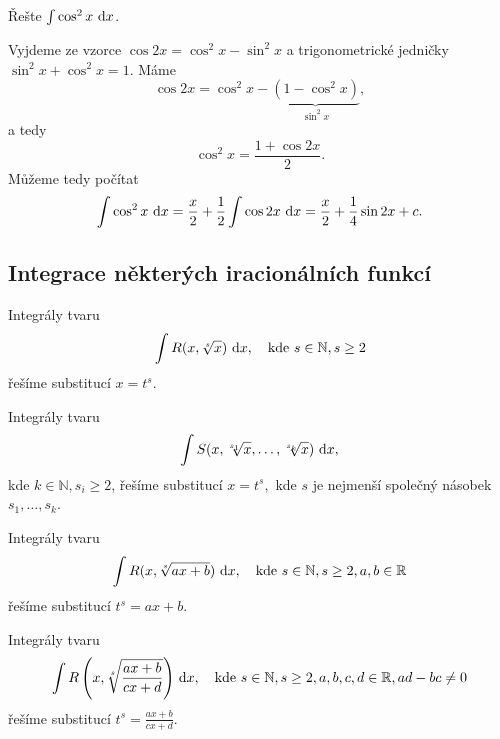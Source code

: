\begin{priklad}\label{prcos}
Řešte $\int \cos^2 x \, \mathop{}\!\mathrm{d} x$.
\end{priklad}

\begin{reseni}
Vyjdeme ze vzorce $\cos 2x = \cos^2 x  - \sin^2 x$ a trigonometrické jedničky $\sin^2 x + \cos^2 x =1$. Máme
$$
    \cos 2 x = \cos ^2 x  - \underbrace{\left( 1 - \cos ^2 x \right )}_{\sin^2 x} ,
$$
a tedy
$$
    \cos^2 x  = \frac{1+ \cos 2x}{2}.
$$
Můžeme tedy počítat
$$
    \int \cos^2 x \, \mathop{}\!\mathrm{d} x =\frac{x}{2} +\frac{1}{2}\int \cos 2 x \, \mathop{}\!\mathrm{d} x = \frac{x }{2} + \frac{1}{4} \sin 2x  + c .
$$
\end{reseni}

\subsection*{Integrace některých iracionálních funkcí}
\begin{veta}
    Integrály tvaru
    $$\int R(x,\sqrt[s]{x}) \, \mathop{}\!\mathrm{d} x, \quad \textrm{kde } s \in \mathbb N, s \geq 2$$
    řešíme substitucí $x=t^s$.
\end{veta}

\begin{veta}
    Integrály tvaru
    $$\int S(x, \sqrt[s_1]{x}, \dots, \sqrt[s_k]{x}  ) \, \mathop{}\!\mathrm{d} x ,$$
    kde $k \in \mathbb N, s_i \geq 2$, řešíme substitucí $x=t^s,$ kde $s$ je nejmenší společný násobek $s_1,\dots, s_k$.
\end{veta}

\begin{veta}
    Integrály tvaru
    $$\int R(x, \sqrt[s]{ax+b} )\, \mathop{}\!\mathrm{d} x, \quad \textrm{kde } s \in \mathbb N, s \geq 2, a,b \in \mathbb R$$
    řešíme substitucí $t^s=ax+b$.
\end{veta}

\begin{veta}
    Integrály tvaru
    $$\int R\left (x, \sqrt[s]{\frac{ax+b}{cx+d}} \right)\, \mathop{}\!\mathrm{d} x, \quad \textrm{kde } s \in \mathbb N, s \geq 2, a,b,c,d \in \mathbb R, ad-bc \ne 0$$
    řešíme substitucí $t^s=\frac{ax+b}{cx+d}.$
\end{veta}

